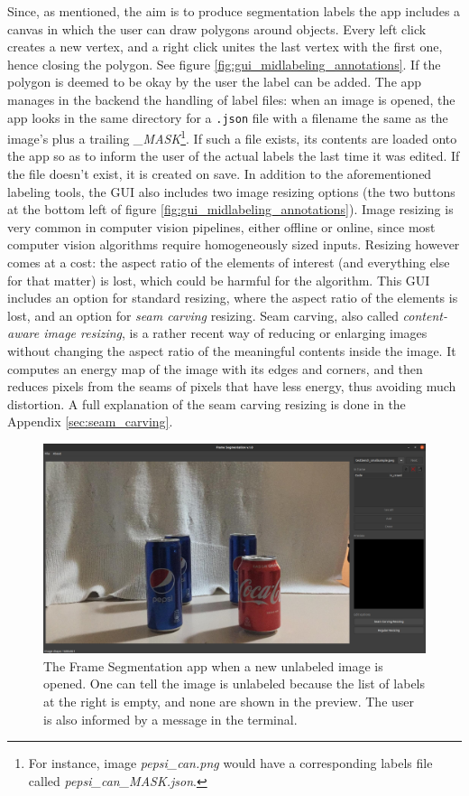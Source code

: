 \documentclass[../main.tex]{subfiles}
\begin{document}
Since, as mentioned, the aim is to produce segmentation labels the app includes a canvas in which the user can draw polygons around objects. Every left click creates a new vertex, and a right click unites the last vertex with the first one, hence closing the polygon. See figure \ref{fig:gui_midlabeling_annotations}. If the polygon is deemed to be okay by the user the label can be added. The app manages in the backend the handling of label files: when an image is opened, the app looks in the same directory for a \texttt{.json} file with a filename the same as the image's plus a trailing \emph{\_MASK}\footnote{For instance, image \emph{pepsi\_can.png} would have a corresponding labels file called \emph{pepsi\_can\_MASK.json}.}. If such a file exists, its contents are loaded onto the app so as to inform the user of the actual labels the last time it was edited. If the file doesn't exist, it is created on save. In addition to the aforementioned labeling tools, the GUI also includes two image resizing options (the two buttons at the bottom left of figure \ref{fig:gui_midlabeling_annotations}). Image resizing is very common in computer vision pipelines, either offline or online, since most computer vision algorithms require homogeneously sized inputs. Resizing however comes at a cost: the aspect ratio of the elements of interest (and everything else for that matter) is lost, which could be harmful for the algorithm. This GUI includes an option for standard resizing, where the aspect ratio of the elements is lost, and an option for \emph{seam carving} resizing. Seam carving, also called \emph{content-aware image resizing}, is a rather recent way of reducing or enlarging images without changing the aspect ratio of the meaningful contents inside the image. It computes an energy map of the image with its edges and corners, and then reduces pixels from the seams of pixels that have less energy, thus avoiding much distortion. A full explanation of the seam carving resizing is done in the Appendix \ref{sec:seam_carving}.

\begin{figure}[H]
    \centering
    \includegraphics[width=1\linewidth]{images/gui_opening_newimg.png}
    \caption{The Frame Segmentation app when a new unlabeled image is opened. One can tell the image is unlabeled because the list of labels at the right is empty, and none are shown in the preview. The user is also informed by a message in the terminal.}
    \label{fig:gui_opening_newimg}
\end{figure}
\end{document}
